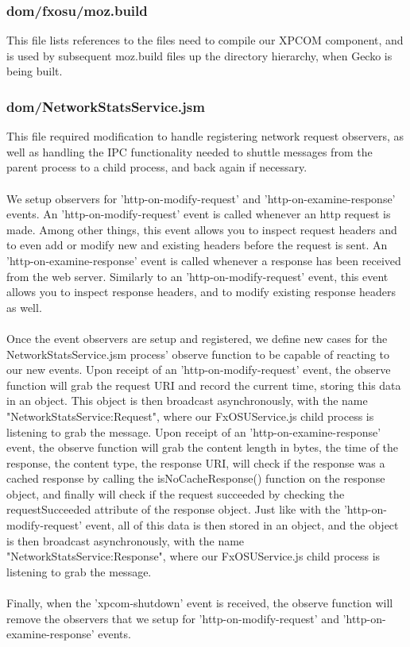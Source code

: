 \documentclass[12pt]{article}
\begin{document}
\subsubsection{dom/fxosu/moz.build}
This file lists references to the files need to compile our XPCOM component, and is used by subsequent moz.build files up the directory hierarchy, when Gecko is being built.

\subsubsection{dom/NetworkStatsService.jsm}
This file required modification to handle registering network request observers, as well as handling the IPC functionality needed to shuttle messages from the parent process to a child process, and back again if necessary.
\\\\
We setup observers for 'http-on-modify-request' and 'http-on-examine-response' events. An 'http-on-modify-request' event is called whenever an http request is made. Among other things, this event allows you to inspect request headers and to even add or modify new and existing headers before the request is sent. An 'http-on-examine-response' event is called whenever a response has been received from the web server. Similarly to an 'http-on-modify-request' event, this event allows you to inspect response headers, and to modify existing response headers as well.
\\\\
Once the event observers are setup and registered, we define new cases for the NetworkStatsService.jsm process' observe function to be capable of reacting to our new events. Upon receipt of an 'http-on-modify-request' event, the observe function will grab the request URI and record the current time, storing this data in an object. This object is then broadcast asynchronously, with the name "NetworkStatsService:Request", where our FxOSUService.js child process is listening to grab the message. Upon receipt of an 'http-on-examine-response' event, the observe function will grab the content length in bytes, the time of the response, the content type, the response URI, will check if the response was a cached response by calling the isNoCacheResponse() function on the response object, and finally will check if the request succeeded by checking the requestSucceeded attribute of the response object. Just like with the 'http-on-modify-request' event, all of this data is then stored in an object, and the object is then broadcast asynchronously, with the name "NetworkStatsService:Response", where our FxOSUService.js child process is listening to grab the message.
\\\\
Finally, when the 'xpcom-shutdown' event is received, the observe function will remove the observers that we setup for 'http-on-modify-request' and 'http-on-examine-response' events.
\end{document}
